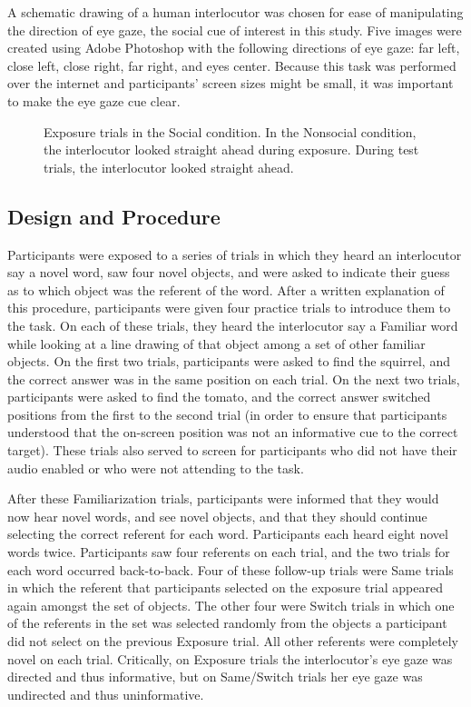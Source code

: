 \documentclass[man]{apa2}
\begin{document}
A schematic drawing of a human interlocutor was chosen for ease of manipulating the direction of eye gaze, the social cue of interest in this study. Five images were created using Adobe Photoshop with the following directions of eye gaze: far left, close left, close right, far right, and eyes center. Because this task was performed over the internet and participants' screen sizes might be small, it was important to make the eye gaze cue clear.
%
\begin{figure}
	\centering
	\caption{Exposure trials in the Social condition. In the Nonsocial condition, the interlocutor looked straight ahead during exposure. During test trials, the interlocutor looked straight ahead.}
\end{figure}
%
\subsection{Design and Procedure}
Participants were exposed to a series of trials in which they heard an interlocutor say a novel word, saw
four novel objects, and were asked to indicate their guess as to which object was the
referent of the word. After a written explanation of this procedure, participants were given
four practice trials to introduce them to the task. On each of these trials, they heard the interlocutor say a
Familiar word while looking at a line drawing of that object among a set of other familiar objects.
On the first two trials, participants were asked to find the squirrel, and the correct answer
was in the same position on each trial. On the next two trials, participants were asked to
find the tomato, and the correct answer switched positions from the first to the second
trial (in order to ensure that participants understood that the on-screen position was not
an informative cue to the correct target). These trials also served to screen for participants
who did not have their audio enabled or who were not attending to the task.

After these Familiarization trials, participants were informed that they would now hear
novel words, and see novel objects, and that they should continue selecting the correct
referent for each word. Participants each heard eight novel words twice. Participants saw four referents
on each trial, and the two trials for each word occurred back-to-back. Four of these
follow-up trials were Same trials in which the referent that participants selected on the exposure trial appeared again amongst the set of objects. The other four were
Switch trials in which one of the referents in the set was selected randomly from the objects
a participant did not select on the previous Exposure trial. All other referents were
completely novel on each trial. Critically, on Exposure trials the interlocutor's eye gaze was directed and thus informative, but on Same/Switch trials her eye gaze was undirected and thus uninformative. 
\end{document}

